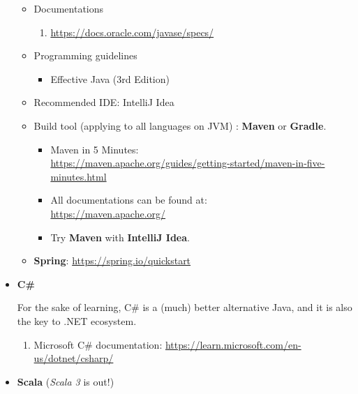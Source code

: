 \documentclass{article}
\begin{document}
\begin{itemize}
\begin{itemize}
\begin{enumerate}
        \end{enumerate}
        \item Documentations
        \begin{enumerate}
            \item \href{https://docs.oracle.com/javase/specs/}{https://docs.oracle.com/javase/specs/}
        \end{enumerate}
        \item Programming guidelines
        \begin{itemize}
            \item Effective Java (3rd Edition) \cite{bloch2008effective}
        \end{itemize}

        \item Recommended IDE: IntelliJ Idea
        \item Build tool (applying to all languages on JVM) : \textbf{Maven} or \textbf{Gradle}.
        \begin{itemize}
            \item Maven in 5 Minutes:\\
            \href{https://maven.apache.org/guides/getting-started/maven-in-five-minutes.html}{https://maven.apache.org/guides/getting-started/maven-in-five-minutes.html}
            \item All documentations can be found at:\\
            \href{https://maven.apache.org/}{https://maven.apache.org/}
            \item Try \textbf{Maven} with \textbf{IntelliJ Idea}.
        \end{itemize}
        \item \textbf{Spring}:
        \href{https://spring.io/quickstart}{https://spring.io/quickstart}
    \end{itemize}
    
    \item \textbf{C\#}
    
    For the sake of learning, C\# is a (much) better alternative Java, and it is also the key to .NET ecosystem.
    \begin{enumerate}
        \item Microsoft C\# documentation:
        \href{https://learn.microsoft.com/en-us/dotnet/csharp/}{https://learn.microsoft.com/en-us/dotnet/csharp/}
    \end{enumerate}

    \item \textbf{Scala} (\emph{Scala 3} is out!)\\
    

\end{itemize}
\end{document}
